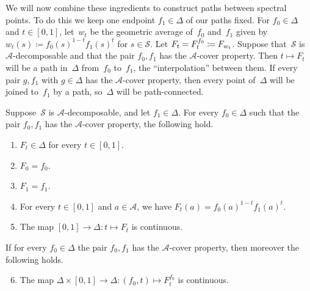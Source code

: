 \documentclass[11pt,letterpaper]{article}
\begin{document}
We will now combine these ingredients to construct paths between spectral points. To do this we keep one endpoint $f_1 \in \Delta$ of our paths fixed. For $f_0 \in \Delta$ and $t \in [0,1]$, let~$w_t$ be the geometric average of~$f_0$ and~$f_1$ given by $w_t(s) \coloneqq f_0(s)^{1-t} f_1(s)^t$ for $s \in \mathcal{S}$. Let $F_t = F^{\smash[t]{f_0}}_t \coloneqq F_{w_t}$. Suppose that~$\mathcal{S}$ is $\mathcal{A}$-decomposable and that the pair $f_0, f_1$ has the $\mathcal{A}$-cover property. Then $t \mapsto F_t$ will be a path in~$\Delta$ from~$f_0$ to~$f_1$, the ``interpolation'' between them. If every pair $g, f_1$ with $g \in \Delta$ has the $\mathcal{A}$-cover property, then every point of~$\Delta$ will be joined to~$f_1$ by a path, so~$\Delta$ will be path-connected.

\begin{theorem}\label{th:interpolation}
Suppose~$\mathcal{S}$ is $\mathcal{A}$-decomposable, and let $f_1 \in \Delta$. For every $f_0 \in \Delta$ such that the pair $f_0, f_1$ has the $\mathcal{A}$-cover property, the following hold.
\begin{enumerate}[\upshape(i)]
\item\label{it:int-spectral} $F_t \in \Delta$ for every $t \in [0,1]$.
\item\label{it:int-start} $F_0 = f_0$.
\item\label{it:int-end} $F_1 = f_1$.
\item\label{it:int-family} For every $t \in [0,1]$ and $a \in \mathcal{A}$, we have $F_t(a) = f_0(a)^{1-t} f_1(a)^t$.
\item\label{it:int-cont} The map $[0,1] \to \Delta : t \mapsto F_t$ is continuous.
\end{enumerate}
If for every $f_0 \in \Delta$ the pair $f_0, f_1$ has the $\mathcal{A}$-cover property, then moreover the following holds.
\begin{enumerate}[\upshape(i)]\setcounter{enumi}{5}
\item\label{it:int-joint} The map $\Delta \times [0,1] \to \Delta : (f_0, t) \mapsto F^{f_0}_t$ is continuous.
\end{enumerate}
\end{theorem}
\end{document}
